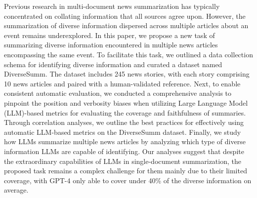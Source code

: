 Previous research in multi-document news summarization has typically concentrated on collating information that all sources agree upon. However, the summarization of diverse information dispersed across multiple articles about an event remains underexplored. In this paper, we propose a new task of summarizing diverse information encountered in multiple news articles encompassing the same event. To facilitate this task, we outlined a data collection schema for identifying diverse information and curated a dataset named DiverseSumm. The dataset includes 245 news stories, with each story comprising 10 news articles and paired with a human-validated reference. Next, to enable consistent automatic evaluation, we conducted a comprehensive analysis to pinpoint the position and verbosity biases when utilizing Large Language Model (LLM)-based metrics for evaluating the coverage and faithfulness of summaries. Through correlation analyses, we outline the best practices for effectively using automatic LLM-based metrics on the DiverseSumm dataset. Finally, we study how LLMs summarize multiple news articles by analyzing which type of diverse information LLMs are capable of identifying. Our analyses suggest that despite the extraordinary capabilities of LLMs in single-document summarization, the proposed task remains a complex challenge for them mainly due to their limited coverage, with GPT-4 only able to cover under 40\% of the diverse information on average.